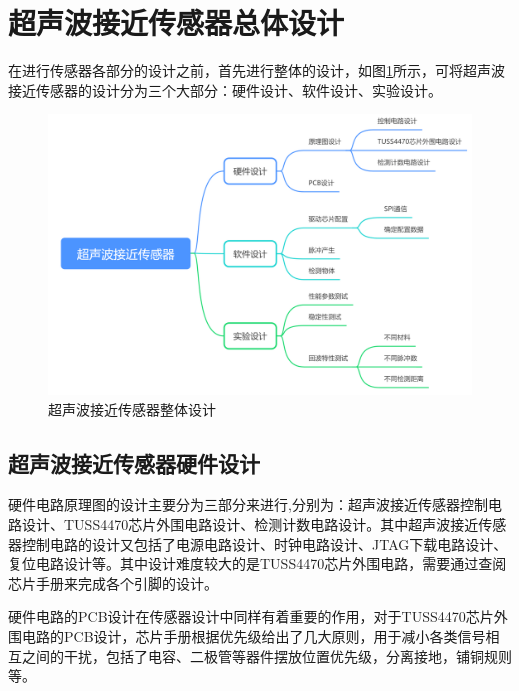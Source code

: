     \newpage
	\section{超声波接近传感器总体设计}

	在进行传感器各部分的设计之前，首先进行整体的设计，如图\ref{超声波接近传感器整体设计}所示，可将超声波接近传感器的设计分为三个大部分：硬件设计、软件设计、实验设计。
\begin{figure}[ht]
	    \centering
	    \includegraphics[width=12cm]{figure/overall designment.png}
	    \caption{超声波接近传感器整体设计}
	    \label{超声波接近传感器整体设计}
\end{figure}

 \subsection{超声波接近传感器硬件设计}
硬件电路原理图的设计主要分为三部分来进行,分别为：超声波接近传感器控制电路设计、TUSS4470芯片外围电路设计、检测计数电路设计。其中超声波接近传感器控制电路的设计又包括了电源电路设计、时钟电路设计、JTAG下载电路设计、复位电路设计等。其中设计难度较大的是TUSS4470芯片外围电路，需要通过查阅芯片手册来完成各个引脚的设计。\par
硬件电路的PCB设计在传感器设计中同样有着重要的作用，对于TUSS4470芯片外围电路的PCB设计，芯片手册根据优先级给出了几大原则，用于减小各类信号相互之间的干扰，包括了电容、二极管等器件摆放位置优先级，分离接地，铺铜规则等。
